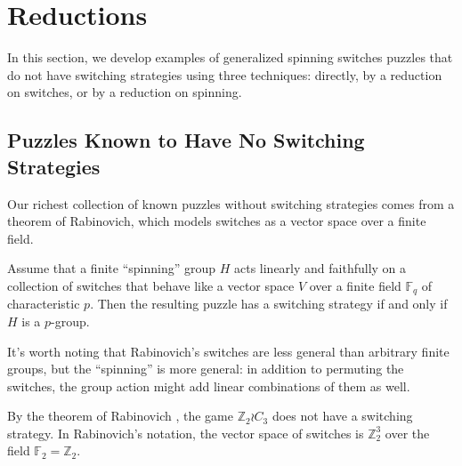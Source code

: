 


\section{Reductions}
\label{sec:Reductions}
In this section, we develop examples of generalized spinning switches puzzles
that do not have switching strategies using three techniques:
directly, by a reduction on switches, or by a reduction on spinning.
%
\subsection{Puzzles Known to Have No Switching Strategies}
Our richest collection of known puzzles without switching strategies comes from
a theorem of Rabinovich, which models switches as a vector space over
a finite field.
\begin{theorem} \cite{Rabinovich2022}
  Assume that a finite ``spinning'' group $H$ acts linearly and faithfully on
  a collection of switches that behave like a vector space
  $V$ over a finite field $\mathbb F_q$ of characteristic $p$.
  Then the resulting puzzle has a switching strategy if and only if $H$ is a
  $p$-group.
  \label{thm:Rabinovich}
\end{theorem}
It's worth noting that Rabinovich's switches are less general than arbitrary
finite groups, but the ``spinning'' is more general: in addition to permuting
the switches, the group action might add linear combinations of them as well.
\begin{example}
  By the theorem of Rabinovich \cite{Rabinovich2022},
  the game $\mathbb Z_2 \wr C_3$ does not have a
  switching strategy. In Rabinovich's notation, the vector space of switches
  is $\mathbb Z_2^3$ over the field $\mathbb F_2 = \mathbb Z_2$.
  \label{ex:NoSolutionZ2C3}
\end{example}

